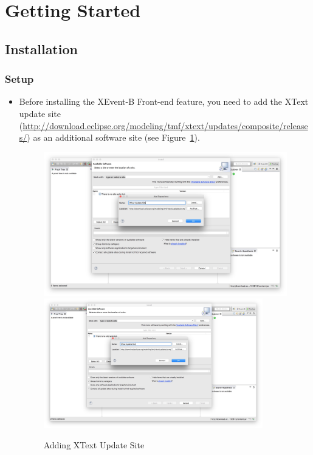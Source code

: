 \section{Getting Started}
\label{sec:getting-started}

\subsection{Installation}
\label{sec:installation}

\subsubsection{Setup}
\label{sec:setup}

\begin{itemize}
\item Before installing the XEvent-B Front-end feature, you need to add the XText update site (\url{http://download.eclipse.org/modeling/tmf/xtext/updates/composite/releases/}) as an additional software site (see Figure~\ref{fig:xtext-updatesite}).
\begin{figure}[!htbp]
  \centering
  \ifplastex
  \includegraphics[width=512]{figures/XTextUpdateSite}
  \else
  \includegraphics[width=0.9\textwidth]{figures/XTextUpdateSite}
  \fi
  \caption{Adding XText Update Site}
  \label{fig:xtext-updatesite}
\end{figure}



\end{itemize}
